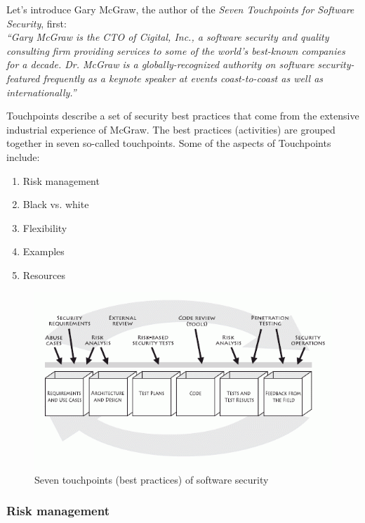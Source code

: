 \documentclass[12pt,a4,twoside]{article}
\begin{document}
Let's introduce Gary McGraw, the author of the \textit{Seven Touchpoints for Software Security}, first:\\

\textit{``Gary McGraw is the CTO of \textit{Cigital, Inc.}, a software security and quality consulting firm providing services to some of the world's best-known companies for a decade. Dr. McGraw is a globally-recognized authority on software security-featured frequently as a keynote speaker at events coast-to-coast as well as internationally.''} \cite{mcgraw_software_security}

Touchpoints describe a set of security best practices that come from the extensive industrial experience of McGraw. The best practices (activities) are grouped together in seven so-called touchpoints. Some of the aspects of Touchpoints include:

\begin{enumerate}
    \item Risk management
    \item Black vs. white
    \item Flexibility
    \item Examples
    \item Resources
\end{enumerate}

\begin{figure}[h]
\centering
\includegraphics[width=1\textwidth]{figures/touchpoints.png}
\caption{Seven touchpoints (best practices) of software security \cite{mcgraw_software_security}}
\label{fig:touchpoints}
\end{figure}

\subsubsection{Risk management}
\end{document}
